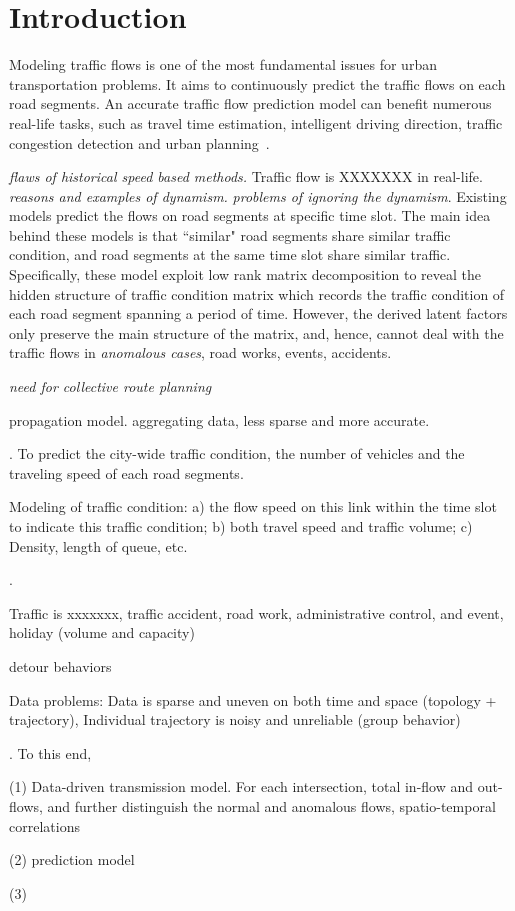 \section{Introduction}
\label{sec-intro}

Modeling traffic flows is one of the most fundamental issues for urban transportation problems. It aims to continuously predict the traffic flows on each road segments. An accurate traffic flow prediction model can benefit numerous real-life tasks, such as travel time estimation, intelligent driving direction, traffic congestion detection and urban planning~\cite{Zheng2014TIST}.


{\em flaws of historical speed based methods.} Traffic flow is XXXXXXX in real-life. {\em reasons and examples of dynamism.} {\em problems of ignoring the dynamism}.
%
Existing models predict the flows on road segments at specific time slot. The main idea behind these models is that ``similar" road segments share similar traffic condition, and road segments at the same time slot share similar traffic. Specifically, these model exploit low rank matrix decomposition to reveal the hidden structure of traffic condition matrix which records the traffic condition of each road segment spanning a period of time. However, the derived latent factors only preserve the main structure of the matrix, and, hence, cannot deal with the traffic flows in {\em anomalous cases}, \eg road works, events, accidents.

{\em need for collective route planning}

propagation model. aggregating data, less sparse and more accurate.

. To predict the city-wide traffic condition, \ie the number of vehicles and the traveling speed of each road segments.

Modeling of traffic condition:
a)	the flow speed on this link within the time slot to indicate this traffic condition;
b)	both travel speed and traffic volume;
c)	Density, length of queue, etc.

.
\bi
\item Traffic is xxxxxxx, \eg traffic accident, road work, administrative control, and event, holiday (volume and capacity)
\item detour behaviors
\item Data problems: Data is sparse and uneven on both time and space (topology + trajectory), Individual trajectory is noisy and unreliable (group behavior)
\ei

. To this end,

\ni (1) Data-driven transmission model. For each intersection, total in-flow and out-flows, and further distinguish the normal and anomalous flows, spatio-temporal correlations

\ni (2) prediction model

\ni (3)


